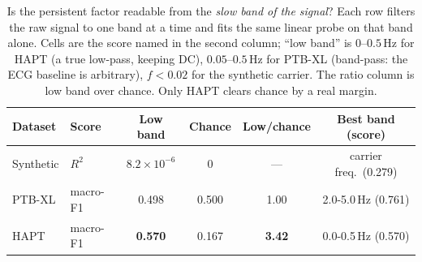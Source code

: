 \begin{table}[!tbp]
\caption{Is the persistent factor readable from the \emph{slow band of the signal}?
Each row filters the raw signal to one band at a time and fits the same linear probe on
that band alone. Cells are the score named in the second column; ``low band'' is
$0$--$0.5$\,Hz for HAPT (a true low-pass, keeping DC), $0.05$--$0.5$\,Hz for PTB-XL
(band-pass: the ECG baseline is arbitrary), $f<0.02$ for the synthetic carrier. The
ratio column is low band over chance. Only HAPT clears chance by a real margin.}
\label{tab:bandaccess}
\centering
\small
\begin{tabular}{llcccc}
\hline
Dataset & Score & Low band & Chance & Low/chance & Best band (score) \\
\hline
Synthetic & $R^2$ & $8.2\times 10^{-6}$ & 0 & --- & carrier freq.\ (0.279) \\
PTB-XL & macro-F1 & 0.498 & 0.500 & 1.00 & 2.0-5.0\,Hz (0.761) \\
HAPT & macro-F1 & \textbf{0.570} & 0.167 & \textbf{3.42} & 0.0-0.5\,Hz (0.570) \\
\hline
\end{tabular}
\end{table}

